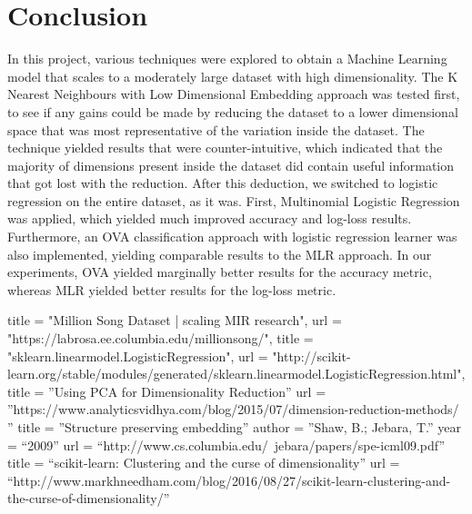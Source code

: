\documentclass[journal]{IEEEtran}
\begin{document}
\section{Conclusion}
In this project, various techniques were explored to obtain a Machine Learning model that scales to a moderately large dataset with high dimensionality. The K Nearest Neighbours with Low Dimensional Embedding approach was tested first, to see if any gains could be made by reducing the dataset to a lower dimensional space that was most representative of the variation inside the dataset. The technique yielded results that were counter-intuitive, which indicated that the majority of dimensions present inside the dataset did contain useful information that got lost with the reduction. After this deduction, we switched to logistic regression on the entire dataset, as it was. First, Multinomial Logistic Regression was applied, which yielded much improved accuracy and log-loss results. Furthermore, an OVA classification approach with logistic regression learner was also implemented, yielding comparable results to the MLR approach. In our experiments, OVA yielded marginally better results for the accuracy metric, whereas MLR yielded better results for the log-loss metric. \par




\blindtext


\ifCLASSOPTIONcaptionsoff
\newpage
\fi


\begin{thebibliography}{1}
	title  = "Million Song Dataset | scaling MIR research",
	url    = "https://labrosa.ee.columbia.edu/millionsong/",
	title  = "sklearn.linearmodel.LogisticRegression",
	url    = "http://scikit-learn.org/stable/modules/generated/sklearn.linearmodel.LogisticRegression.html",
	title = ''Using PCA for Dimensionality Reduction''
	url = ''https://www.analyticsvidhya.com/blog/2015/07/dimension-reduction-methods/ ''
	title = ''Structure preserving embedding''
	author = ''Shaw, B.; Jebara, T.''
	year = ``2009''
	url = ``http://www.cs.columbia.edu/~jebara/papers/spe-icml09.pdf''
	title = ``scikit-learn: Clustering and the curse of dimensionality''
	url = ``http://www.markhneedham.com/blog/2016/08/27/scikit-learn-clustering-and-the-curse-of-dimensionality/''
	
\end{thebibliography}
\end{document}

